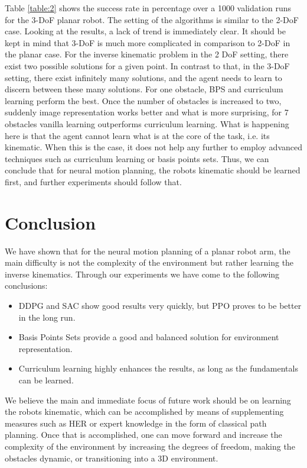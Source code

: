\documentclass[conference]{IEEEtran}
\begin{document}
Table \ref{table:2} shows the success rate in percentage over a 1000 validation runs for the 3-DoF planar robot. The setting of the algorithms is similar to the 2-DoF case. 
Looking at the results, a lack of trend is immediately clear. It should be kept in mind that 3-DoF is much more complicated in comparison to 2-DoF in the planar case. For the inverse kinematic problem in the 2 DoF setting, there exist two possible solutions for a given point. In contrast to that, in the 3-DoF setting, there exist infinitely many solutions, and the agent needs to learn to discern between these many solutions. 
For one obstacle, BPS and curriculum learning perform the best. Once the number of obstacles is increased to two, suddenly image representation works better and what is more surprising, for 7 obstacles vanilla learning outperforms curriculum learning. What is happening here is that the agent cannot learn what is at the core of the task, i.e. its kinematic. When this is the case, it does not help any further to employ advanced techniques such as curriculum learning or basis points sets. Thus, we can conclude that for neural motion planning, the robots kinematic should be learned first, and further experiments should follow that.

\section{Conclusion} 

We have shown that for the neural motion planning of a planar robot arm, the main difficulty is not the complexity of the environment but rather learning the inverse kinematics. Through our experiments we have come to the following conclusions:
 \begin{itemize}
\item DDPG and SAC show good results very quickly, but PPO proves to be better in the long run.
\item Basis Points Sets provide a good and balanced solution for environment representation.
\item Curriculum learning highly enhances the results, as long as the fundamentals can be learned.
\end{itemize}
We believe the main and immediate focus of future work should be on learning the robots kinematic, which can be accomplished by means of supplementing measures such as HER or expert knowledge in the form of classical path planning. Once that is accomplished, one can move forward and increase the complexity of the environment by increasing the degrees of freedom, making the obstacles dynamic, or transitioning into a 3D environment.
\end{document}

